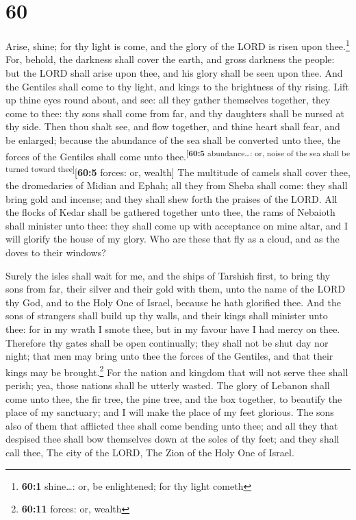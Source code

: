 \hypertarget{section-59}{%
\section{60}\label{section-59}}

 Arise, shine; for thy light is come, and the glory of the
LORD is risen upon thee.\footnote{\textbf{60:1} shine\ldots: or, be
  enlightened; for thy light cometh}  For, behold, the
darkness shall cover the earth, and gross darkness the people: but the
LORD shall arise upon thee, and his glory shall be seen upon thee.
 And the Gentiles shall come to thy light, and kings to
the brightness of thy rising.  Lift up thine eyes round
about, and see: all they gather themselves together, they come to thee:
thy sons shall come from far, and thy daughters shall be nursed at thy
side.  Then thou shalt see, and flow together, and thine
heart shall fear, and be enlarged; because the abundance of the sea
shall be converted unto thee, the forces of the Gentiles shall come unto
thee.\textsuperscript{{[}\textbf{60:5} abundance\ldots: or, noise of the
sea shall be turned toward thee{]}}{[}\textbf{60:5} forces: or,
wealth{]}  The multitude of camels shall cover thee, the
dromedaries of Midian and Ephah; all they from Sheba shall come: they
shall bring gold and incense; and they shall shew forth the praises of
the LORD.  All the flocks of Kedar shall be gathered
together unto thee, the rams of Nebaioth shall minister unto thee: they
shall come up with acceptance on mine altar, and I will glorify the
house of my glory.  Who are these that fly as a cloud, and
as the doves to their windows?

 Surely the isles shall wait for me, and the ships of
Tarshish first, to bring thy sons from far, their silver and their gold
with them, unto the name of the LORD thy God, and to the Holy One of
Israel, because he hath glorified thee.  And the sons of
strangers shall build up thy walls, and their kings shall minister unto
thee: for in my wrath I smote thee, but in my favour have I had mercy on
thee.  Therefore thy gates shall be open continually;
they shall not be shut day nor night; that men may bring unto thee the
forces of the Gentiles, and that their kings may be brought.\footnote{\textbf{60:11}
  forces: or, wealth}  For the nation and kingdom that
will not serve thee shall perish; yea, those nations shall be utterly
wasted.  The glory of Lebanon shall come unto thee, the
fir tree, the pine tree, and the box together, to beautify the place of
my sanctuary; and I will make the place of my feet glorious.
 The sons also of them that afflicted thee shall come
bending unto thee; and all they that despised thee shall bow themselves
down at the soles of thy feet; and they shall call thee, The city of the
LORD, The Zion of the Holy One of Israel.

